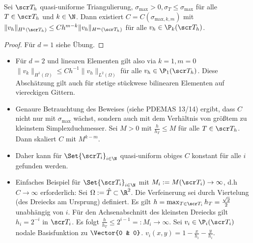 \begin{st} \label{3.81}
	Sei $\scr T_h$ quasi-uniforme Triangulierung, $\sigma_{\text{max}} > 0, \sigma_T \le \sigma_{\text{max}}$ für alle $T \in \scr T_h$ und $k \in \N$.
	Dann existiert $C = C(\sigma_{\text{max}, k, m})$ mit
	\begin{math}
		\|v_h\|_{H^k(\scr T_h)} \le C h^{m-k} \|v_h\|_{H^m(\scr T_h)}
	\end{math}
	für alle $v_h \in \P_k(\scr T_h)$.
	\begin{proof}
		Für $d = 1$ siehe Übung.
	\end{proof}
	\begin{note}
		\begin{itemize}
			\item
				Für $d = 2$ und linearen Elementen gilt also via $k = 1, m = 0$
				\begin{math}
					\|v_k\|_{H^1(\Omega)}
					\le C h^{-1} \|v_h\|_{L^2(\Omega)}
				\end{math}
				für alle $v_h \in \P_1(\scr T_h)$.
				Diese Abschätzung gilt auch für stetige stückwese bilinearen Elementen auf viereckigen Gittern.
			\item
				Genaure Betrauchtung des Beweises (siehe PDEMAS 13/14) ergibt, dass $C$ nicht nur mit $\sigma_{\text{max}}$ wächst, sondern auch mit dem Verhältnis von größtem zu kleinstem Simplexduchmesser.
				Sei $M > 0$ mit $\frac{h}{h_T} \le M$ für alle $T \in \scr T_h$.
				Dann skaliert $C$ mit $M^{k-m}$.
			\item
				Daher kann für $\Set{\scr T_i}_{i\in \N}$ quasi-uniform obiges $C$ konstant für alle $i$ gefunden werden.
			\item
				Einfaches Beispiel für $\Set{\scr T_i}_{i\in\N}$ mit $M_i := M(\scr T_i) \to \infty$, d.h $C \to \infty$ erforderlich:
				Sei $\Omega := \hat T \subset \R^2$.
				Die Verfeinerung sei durch Viertelung (des Dreiecks am Ursprung) definiert.
				Es gilt
				\begin{math}
					h = \max_{T \in \scr T_i} h_T = \frac{\sqrt 2}{2}
				\end{math}
				unabhängig von $i$.
				Für den Achsenabschnitt des kleinsten Dreiecks gilt $h_i = 2^{-i}$ in $\scr T_i$.
				Es folgt
				\begin{math}
					\frac{h}{h_T} \le 2^{i-1} =: M_i \to \infty.
				\end{math}
				Sei $v_i \in \P_i(\scr T_i)$ nodale Basisfunktion zu $\Vector{0 & 0}$.
				\begin{math}
					v_i(x,y) = 1 - \frac{x}{h_i} - \frac{y}{h_i}.

\end{math}
\end{itemize}
\end{note}
\end{st}
